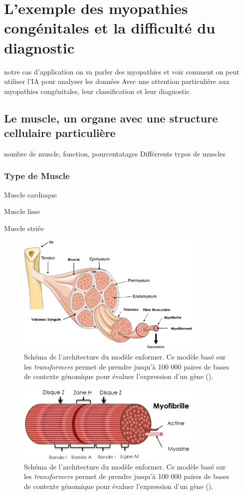 \chapter{L’exemple des myopathies congénitales et la difficulté du diagnostic}
notre cas d'application on va parler des myopathies et voir comment on peut utiliser l'IA pour analyser les données
Avec une attention particulière aux myopathies congénitales, leur classification et leur diagnostic.

\section{Le muscle, un organe avec une structure cellulaire particulière}
nombre de muscle, fonction, pourcentatages
Différrents types de muscles 

\subsection{Type de Muscle}
Muscle cardiaque

Muscle lisse

Muscle striée
\begin{figure}[!htbp]
 \centering
 \includegraphics[width=0.8\textwidth]{figures/muscle.png}
 \caption[Schéma de l'architecture du modèle enformer]{Schéma de l'architecture du modèle enformer. Ce modèle basé sur les \textit{transformers} permet de prendre jusqu'à 100 000 paires de bases de contexte génomique pour évaluer l'expression d'un gène (\cite{avsec_effective_2021}).}
 \label{fig:enformer}
\end{figure}

\begin{figure}[!htbp]
 \centering
 \includegraphics[width=0.8\textwidth]{figures/sarcomere.png}
 \caption[Schéma de l'architecture du modèle enformer]{Schéma de l'architecture du modèle enformer. Ce modèle basé sur les \textit{transformers} permet de prendre jusqu'à 100 000 paires de bases de contexte génomique pour évaluer l'expression d'un gène (\cite{avsec_effective_2021}).}
 \label{fig:enformer}
\end{figure}


